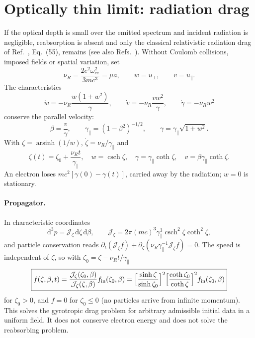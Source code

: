 \documentclass[11pt,a4paper]{article}
\numberwithin{equation}{section}
\newcommand{\dd}{\mathrm{d}}
\newcommand{\upar}{u_\parallel}
\newcommand{\uperp}{u_\perp}
\newcommand{\arsinh}{\operatorname{arsinh}}
\begin{document}
\section{Optically thin limit: radiation drag}\label{sec:drag}

If the optical depth is small over the emitted spectrum and incident radiation
is negligible, reabsorption is absent and only the classical relativistic
radiation drag of Ref.~\cite{KK96}, Eq.~(55), remains (see also
Refs.~\cite{Kennedy21,Hirvijoki15}). Without Coulomb collisions, imposed fields
or spatial variation, set
\begin{equation}
\nu_R=\frac{2e^2\omega_{ce}^2}{3mc^3}=\mu a,\qquad w=\uperp,\qquad v=\upar .
\end{equation}
The characteristics
\begin{equation}
\dot w=-\nu_R\frac{w(1+w^2)}{\gamma},\qquad \dot v=-\nu_R\frac{vw^2}{\gamma},\qquad \dot\gamma=-\nu_Rw^2
\end{equation}
conserve the parallel velocity:
\begin{equation}
\beta=\frac v\gamma,\qquad \gamma_\parallel=(1-\beta^2)^{-1/2},\qquad \gamma=\gamma_\parallel\sqrt{1+w^2}.
\end{equation}
With $\zeta=\arsinh(1/w)$, $\dot\zeta=\nu_R/\gamma_\parallel$ and
\begin{equation}
\boxed{\zeta(t)=\zeta_0+\frac{\nu_Rt}{\gamma_\parallel},\quad w=\operatorname{csch}\zeta,\quad
\gamma=\gamma_\parallel\coth\zeta,\quad v=\beta\gamma_\parallel\coth\zeta .}
\end{equation}
An electron loses $mc^2[\gamma(0)-\gamma(t)]$, carried away by the radiation;
$w=0$ is stationary.

\paragraph{Propagator.} In characteristic coordinates
\begin{equation}
\dd^3p=\mathcal J_\zeta\,\dd\zeta\,\dd\beta,\qquad \mathcal J_\zeta=2\pi(mc)^3\gamma_\parallel^3\operatorname{csch}^2\zeta\coth^2\zeta,
\end{equation}
and particle conservation reads
$\partial_t(\mathcal J_\zeta f)+\partial_\zeta(\nu_R\gamma_\parallel^{-1}\mathcal J_\zeta f)=0$.
The speed is independent of $\zeta$, so with $\zeta_0=\zeta-\nu_Rt/\gamma_\parallel$
\begin{equation}
\boxed{f(\zeta,\beta,t)=\frac{\mathcal J_\zeta(\zeta_0,\beta)}{\mathcal J_\zeta(\zeta,\beta)}f_{\mathrm{in}}(\zeta_0,\beta)
=\Bigl[\frac{\sinh\zeta}{\sinh\zeta_0}\Bigr]^2\Bigl[\frac{\coth\zeta_0}{\coth\zeta}\Bigr]^2f_{\mathrm{in}}(\zeta_0,\beta)}
\end{equation}
for $\zeta_0>0$, and $f=0$ for $\zeta_0\le0$ (no particles arrive from infinite
momentum). This solves the gyrotropic drag problem for arbitrary admissible
initial data in a uniform field. It does not conserve electron energy and does
not solve the reabsorbing problem.
\end{document}
